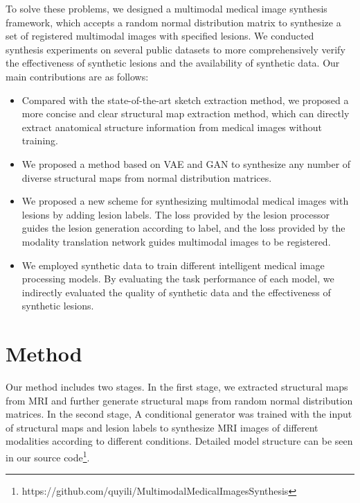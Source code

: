 \documentclass[runningheads]{llncs}
\begin{document}
	To solve these problems, we designed a multimodal medical image synthesis framework, which accepts a random normal distribution matrix to synthesize a set of registered multimodal images with specified lesions. We conducted synthesis experiments on several public datasets to more comprehensively verify the effectiveness of synthetic lesions and the availability of synthetic data. Our main contributions are as follows:
	\begin{itemize}
	\item Compared with the state-of-the-art sketch extraction method, we proposed a more concise and clear structural map extraction method, which can directly extract anatomical structure information from medical images without training.
	\item We proposed a method based on VAE and GAN to synthesize any number of diverse structural maps from normal distribution matrices.
	\item We proposed a new scheme for synthesizing multimodal medical images with lesions by adding lesion labels. The loss provided by the lesion processor guides the lesion generation according to label, and the loss provided by the modality translation network guides multimodal images to be registered.
	\item We employed synthetic data to train different intelligent medical image processing models. By evaluating the task performance of each model, we indirectly evaluated the quality of synthetic data and the effectiveness of synthetic lesions.
	\end{itemize}

	\section{Method}
	\label{method}
	Our method includes two stages. In the first stage, we extracted structural maps from MRI and further generate structural maps from random normal distribution matrices. In the second stage, A conditional generator was trained with the input of structural maps and lesion labels to synthesize MRI images of different modalities according to different conditions. Detailed model structure can be seen in our source code\footnote{https://github.com/quyili/MultimodalMedicalImagesSynthesis}.
	
\end{document}
